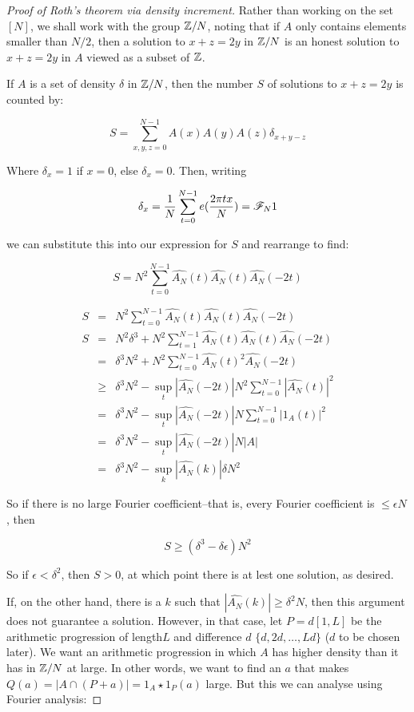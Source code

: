 \documentclass{report}
\theoremstyle{remark}
\numberwithin{equation}{section}
\begin{document}
\begin{proof}[Proof of Roth's theorem via density increment]

  Rather than working on the set $[N]$, we shall work with the group
  $\mathbb{Z}/N$, noting that if $A$ only contains elements smaller than
  $N/2$, then a solution to $x+z=2y$ in $\mathbb{Z}/N$ is an honest solution
  to $x+z=2y$ in $A$ viewed as a subset of $\mathbb{Z}$.  

  If $A$ is a set of density $\delta$ in $\mathbb{Z}/N$, then the number $S$
  of solutions to $x+z=2y$ is counted by: 

  \[S = \sum_{x, y, z = 0}^{N-1}A(x)A(y)A(z)\delta_{x+y-z}\]

  Where $\delta_x = 1$ if $x = 0$, else $\delta_x = 0$.  Then, writing

  \[\delta_x = \frac{1}{N}\sum_{t=0}^{N-1}e(\frac{2\pi tx}{N}) =
    \mathscr{F}_N 1\]

  we can substitute this into our expression for $S$ and rearrange to
  find: 

  \[S = N^2 \sum_{t=0}^{N-1} \widehat{A_N}(t)\widehat{A_N}(t)\widehat{A_N}(-2t)\]

  \begin{eqnarray*}
    S &=& N^2 \sum_{t=0}^{N-1} \widehat{A_N}(t)\widehat{A_N}(t)\widehat{A_N}(-2t) \\
    S &=& N^2 \delta^3 + N^2 \sum_{t=1}^{N-1} \widehat{A_N}(t)\widehat{A_N}(t)\widehat{A_N}(-2t) \\
      &=& \delta^3 N^2 + N^2 \sum_{t=0}^{N-1} \widehat{A_N}(t)^2\widehat{A_N}(-2t) \\
      &\geq& \delta^3 N^2 - \sup_t |\widehat{A_N}(-2t)| N^2 \sum_{t=0}^{N-1} |\widehat{A_N}(t)|^2 \\
      &=& \delta^3 N^2 - \sup_t |\widehat{A_N}(-2t)| N \sum_{t=0}^{N-1} |1_A(t)|^2 \\
      &=& \delta^3 N^2 - \sup_t |\widehat{A_N}(-2t)| N |A|\\
      &=& \delta^3 N^2 - \sup_k |\widehat{A_N}(k)| \delta N^2
  \end{eqnarray*}

  So if there is no large Fourier coefficient--that is, every Fourier
  coefficient is $\leq \epsilon N$, then
  
  \[S \geq (\delta^3 - \delta\epsilon) N^2\]

  So if $\epsilon < \delta^2$, then $S > 0$, at which point there is at
  lest one solution, as desired.  
  
  If, on the other hand, there is a $k$ such that
  $|\widehat{A_N}(k)| \geq \delta^2 N$, then this argument does not
  guarantee a solution.  However, in that case, let $P = d[1,L]$ be
  the arithmetic progression of length$L$ and difference $d$
  $\{d, 2d, \ldots ,Ld\}$ ($d$ to be chosen later).  We want an
  arithmetic progression in which $A$ has higher density than it has
  in $\mathbb{Z}/N$ at large.  In other words, we want to find an $a$ that
  makes $Q(a) = |A \cap (P+a)| = 1_A \star 1_P(a)$ large.  But this we
  can analyse using Fourier analysis:
  

\end{proof}
\end{document}
